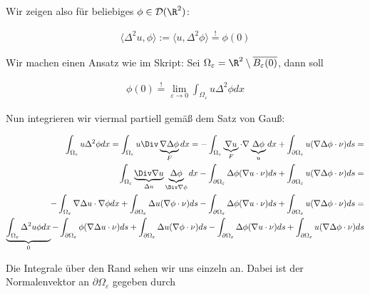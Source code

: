 \begin{solution}

Wir zeigen also für beliebiges $\phi \in \mathcal{D}(\R^2)$:

\begin{align*}
  \langle \Delta^2u, \phi \rangle
  :=
  \langle u, \Delta^2 \phi \rangle
  \stackrel{!}{=}
  \phi(0)
\end{align*}

Wir machen einen Ansatz wie im Skript: Sei $\Omega_\varepsilon = \R^2 \setminus \overline{B_\varepsilon(0)}$, dann soll

\begin{align*}
  \phi(0)
  \stackrel{!}{=}
  \lim_{\varepsilon \rightarrow 0}\int_{\Omega_\varepsilon} u \Delta^2 \phi dx
\end{align*}

Nun integrieren wir viermal partiell gemäß dem Satz von Gauß:


\begin{align*}
  \int_{\Omega_\varepsilon} u \Delta^2 \phi dx
  =
  \int_{\Omega_\varepsilon} u \Div\underbrace{\nabla \Delta \phi}_F dx
  =
  -\int_{\Omega_\varepsilon} \underbrace{\nabla u}_{F} \cdot \nabla \underbrace{\Delta \phi}_{u} dx
  +
  \int_{\partial \Omega_\varepsilon} u(\nabla \Delta \phi \cdot \nu) ds
  = \\
  \int_{\Omega_\varepsilon} \underbrace{\Div\nabla u}_{\Delta u} \underbrace{\Delta \phi}_{\Div \nabla \phi} dx
  -
  \int_{\partial \Omega_\varepsilon} \Delta \phi (\nabla u \cdot \nu) ds
  +
  \int_{\partial \Omega_\varepsilon} u(\nabla \Delta \phi \cdot \nu) ds
  = \\
  -\int_{\Omega_\varepsilon} \nabla \Delta u \cdot \nabla \phi dx
  +
  \int_{\partial \Omega_\varepsilon} \Delta u (\nabla \phi \cdot \nu) ds
  -
  \int_{\partial \Omega_\varepsilon} \Delta \phi (\nabla u \cdot \nu) ds
  +
  \int_{\partial \Omega_\varepsilon} u(\nabla \Delta \phi \cdot \nu) ds
  = \\
  \underbrace{\int_{\Omega_\varepsilon} \Delta^2 u \phi dx}_{0}
  -
  \int_{\partial \Omega_\varepsilon} \phi (\nabla \Delta u \cdot \nu) ds
  +
  \int_{\partial \Omega_\varepsilon} \Delta u (\nabla \phi \cdot \nu) ds
  -
  \int_{\partial \Omega_\varepsilon} \Delta \phi (\nabla u \cdot \nu) ds
  +
  \int_{\partial \Omega_\varepsilon} u(\nabla \Delta \phi \cdot \nu) ds
\end{align*}

Die Integrale über den Rand sehen wir uns einzeln an. Dabei ist der Normalenvektor an
$\partial \Omega_\varepsilon$ gegeben durch


\end{solution}

